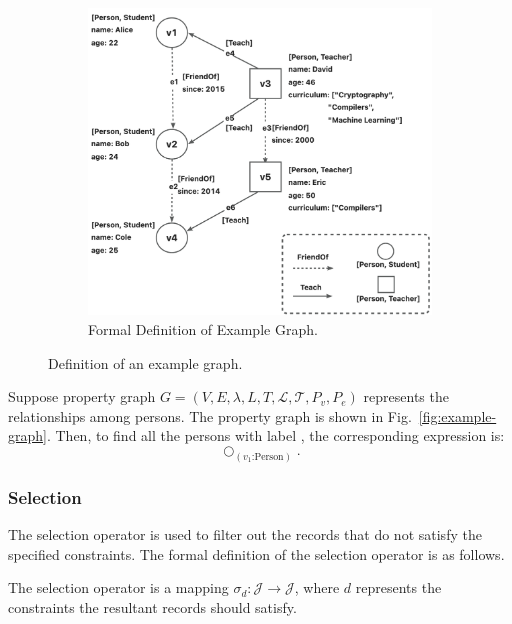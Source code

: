 \begin{figure}
\begin{subfigure}[b]{0.4\linewidth}
        \includegraphics[width=\linewidth]{./figures/example-graph.png}
        \caption{Formal Definition of Example Graph.}
        \label{fig:example-graph-def}
    \end{subfigure}
    \caption{Definition of an example graph.}
    \label{fig:example-graph-full}
\end{figure}

\begin{example}
    Suppose property graph $G = (V, E, \lambda, L, T, \mathcal{L}, \mathcal{T}, P_v, P_e)$ represents the relationships among persons.
    The property graph is shown in Fig.~\ref{fig:example-graph}.
    Then, to find all the persons with label , the corresponding expression is:
    \begin{equation*}
        \bigcirc_{(v_1\text{:Person})}.
    \end{equation*}
\end{example}


\subsubsection{Selection}

The selection operator is used to filter out the records that do not satisfy the specified constraints.
The formal definition of the selection operator is as follows.

\begin{definition}
    The selection operator is a mapping $\sigma_d : \mathcal{J} \rightarrow \mathcal{J}$, where $d$ represents the constraints the resultant records should satisfy.
\end{definition}

